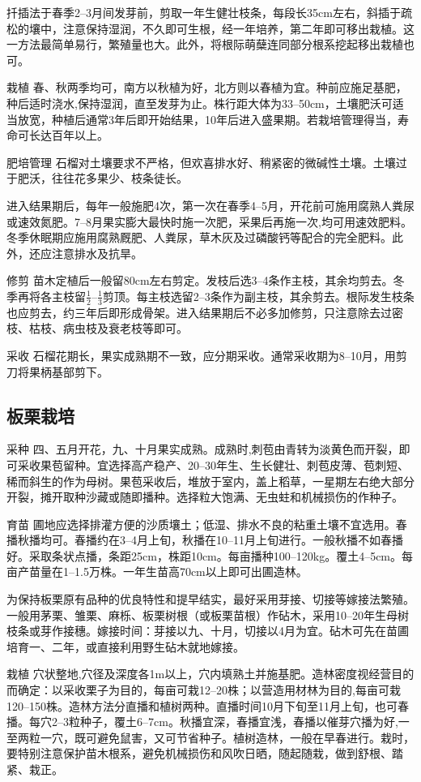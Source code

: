 \documentclass{ctexbook}
\begin{document}
扦插法于春季2--3月间发芽前，剪取一年生健壮枝条，每段长35cm左右，斜插于疏松的壤中，注意保持湿润，不久即可生根，经一年培养，第二年即可移出栽植。这一方法最简单易行，繁殖量也大。此外，将根际萌蘖连同部分根系挖起移出栽植也可。

栽植 春、秋两季均可，南方以秋植为好，北方则以春植为宜。种前应施足基肥，种后适时浇水,保持湿润，直至发芽为止。株行距大体为33--50cm，土壤肥沃可适当放宽，种植后通常3年后即开始结果，10年后进入盛果期。若栽培管理得当，寿命可长达百年以上。

肥培管理 石榴对土壤要求不严格，但欢喜排水好、稍紧密的微碱性土壤。土壤过于肥沃，往往花多果少、枝条徒长。

进入结果期后，每年一般施肥4次，第一次在春季4--5月，开花前可施用腐熟人粪尿或速效氮肥。7--8月果实膨大最快时施一次肥，采果后再施一次,均可用速效肥料。冬季休眠期应施用腐熟厩肥、人粪尿，草木灰及过磷酸钙等配合的完全肥料。此外，还应注意排水及抗旱。

修剪 苗木定植后一般留80cm左右剪定。发枝后选3--4条作主枝，其余均剪去。冬季再将各主枝留$\frac{1}{2}$--$\frac{1}{3}$剪顶。每主枝选留2--3条作为副主枝，其余剪去。根际发生枝条也应剪去，约三年后即形成骨架。进入结果期后不必多加修剪，只注意除去过密枝、枯枝、病虫枝及衰老枝等即可。

采收 石榴花期长，果实成熟期不一致，应分期采收。通常采收期为8--10月，用剪刀将果柄基部剪下。
\subsection{板栗栽培}
采种 四、五月开花，九、十月果实成熟。成熟时,刺苞由青转为淡黄色而开裂，即可采收果苞留种。宜选择高产稳产、20--30年生、生长健壮、刺苞皮薄、苞刺短、稀而斜生的作为母树。果苞采收后，堆放于室内，盖上稻草，一星期左右绝大部分开裂，摊开取种沙藏或随即播种。选择粒大饱满、无虫蛀和机械损伤的作种子。

育苗 圃地应选择排灌方便的沙质壤土；低湿、排水不良的粘重土壤不宜选用。春播秋播均可。春播约在3--4月上旬，秋播在10--11月上旬进行。一般秋播不如春播好。采取条状点播，条距25cm，株距10cm。每亩播种100--120kg。覆土4--5cm。每亩产苗量在1--1.5万株。一年生苗高70cm以上即可出圃造林。

为保持板栗原有品种的优良特性和提早结实，最好采用芽接、切接等嫁接法繁殖。一般用茅栗、雏栗、麻栎、板栗树根（或板栗苗根）作砧木，采用10--20年生母树枝条或芽作接穗。嫁接时间：芽接以九、十月，切接以4月为宜。砧木可先在苗圃培育一、二年，或直接利用野生砧木就地嫁接。

栽植 穴状整地,穴径及深度各1m以上，穴内填熟土并施基肥。造林密度视经营目的而确定：以采收栗子为目的，每亩可栽12--20株；以营造用材林为目的,每亩可栽120--150株。造林方法分直播和植树两种。直播时间10月下旬至11月上旬，也可春播。每穴2--3粒种子，覆土6--7cm。秋播宜深，春播宜浅，春播以催芽穴播为好,一至两粒一穴，既可避免鼠害，又可节省种子。植树造林，一般在早春进行。栽时，要特别注意保护苗木根系，避免机械损伤和风吹日晒，随起随栽，做到舒根、踏紧、栽正。
\end{document}
